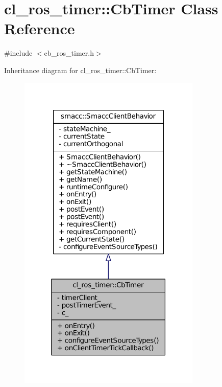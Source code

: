 \hypertarget{classcl__ros__timer_1_1CbTimer}{}\section{cl\+\_\+ros\+\_\+timer\+:\+:Cb\+Timer Class Reference}
\label{classcl__ros__timer_1_1CbTimer}


{\ttfamily \#include $<$cb\+\_\+ros\+\_\+timer.\+h$>$}



Inheritance diagram for cl\+\_\+ros\+\_\+timer\+:\+:Cb\+Timer\+:
\nopagebreak
\begin{figure}[H]
\begin{center}
\leavevmode
\includegraphics[width=247pt]{classcl__ros__timer_1_1CbTimer__inherit__graph}
\end{center}
\end{figure}



